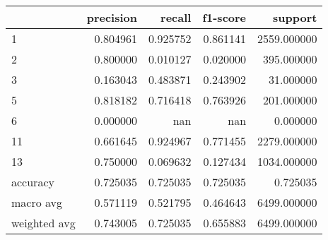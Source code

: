 \begin{tabular}{lrrrr}
\toprule
 & precision & recall & f1-score & support \\
\midrule
1 & 0.804961 & 0.925752 & 0.861141 & 2559.000000 \\
2 & 0.800000 & 0.010127 & 0.020000 & 395.000000 \\
3 & 0.163043 & 0.483871 & 0.243902 & 31.000000 \\
5 & 0.818182 & 0.716418 & 0.763926 & 201.000000 \\
6 & 0.000000 & nan & nan & 0.000000 \\
11 & 0.661645 & 0.924967 & 0.771455 & 2279.000000 \\
13 & 0.750000 & 0.069632 & 0.127434 & 1034.000000 \\
accuracy & 0.725035 & 0.725035 & 0.725035 & 0.725035 \\
macro avg & 0.571119 & 0.521795 & 0.464643 & 6499.000000 \\
weighted avg & 0.743005 & 0.725035 & 0.655883 & 6499.000000 \\
\bottomrule
\end{tabular}
